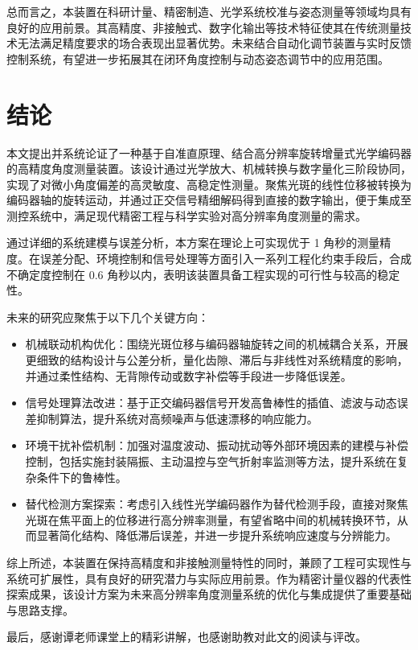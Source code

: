 总而言之，本装置在科研计量、精密制造、光学系统校准与姿态测量等领域均具有良好的应用前景。其高精度、非接触式、数字化输出等技术特征使其在传统测量技术无法满足精度要求的场合表现出显著优势。未来结合自动化调节装置与实时反馈控制系统，有望进一步拓展其在闭环角度控制与动态姿态调节中的应用范围。

\section{结论}

本文提出并系统论证了一种基于自准直原理、结合高分辨率旋转增量式光学编码器的高精度角度测量装置。该设计通过光学放大、机械转换与数字量化三阶段协同，实现了对微小角度偏差的高灵敏度、高稳定性测量。聚焦光斑的线性位移被转换为编码器轴的旋转运动，并通过正交信号精细解码得到直接的数字输出，便于集成至测控系统中，满足现代精密工程与科学实验对高分辨率角度测量的需求。

通过详细的系统建模与误差分析，本方案在理论上可实现优于 1 角秒的测量精度。在误差分配、环境控制和信号处理等方面引入一系列工程化约束手段后，合成不确定度控制在 0.6 角秒以内，表明该装置具备工程实现的可行性与较高的稳定性。

\begin{ubox2}{未来的研究应聚焦于以下几个关键方向：}
	\begin{itemize}
		\item 机械联动机构优化：围绕光斑位移与编码器轴旋转之间的机械耦合关系，开展更细致的结构设计与公差分析，量化齿隙、滞后与非线性对系统精度的影响，并通过柔性结构、无背隙传动或数字补偿等手段进一步降低误差。
		
		\item 信号处理算法改进：基于正交编码器信号开发高鲁棒性的插值、滤波与动态误差抑制算法，提升系统对高频噪声与低速漂移的响应能力。
		
		\item 环境干扰补偿机制：加强对温度波动、振动扰动等外部环境因素的建模与补偿控制，包括实施封装隔振、主动温控与空气折射率监测等方法，提升系统在复杂条件下的鲁棒性。
		
		\item 替代检测方案探索：考虑引入线性光学编码器作为替代检测手段，直接对聚焦光斑在焦平面上的位移进行高分辨率测量，有望省略中间的机械转换环节，从而显著简化结构、降低滞后误差，并进一步提升系统响应速度与分辨能力。
	\end{itemize}
\end{ubox2}

综上所述，本装置在保持高精度和非接触测量特性的同时，兼顾了工程可实现性与系统可扩展性，具有良好的研究潜力与实际应用前景。作为精密计量仪器的代表性探索成果，该设计方案为未来高分辨率角度测量系统的优化与集成提供了重要基础与思路支撑。

最后，感谢谭老师课堂上的精彩讲解，也感谢助教对此文的阅读与评改。



